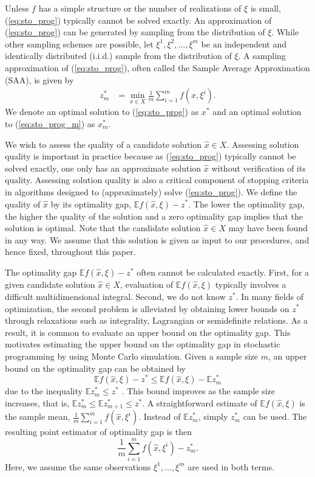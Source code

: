 \documentclass[12pt]{article}
\newcommand{\e}[1]{\mathbb{E} %
#1 %
}
\newcommand{\x}{x}
\newcommand{\xh}{{\hat{\x}}}
\newcommand{\xs}{\x^*}
\newcommand{\xit}{\xi}
\newcommand{\xiti}{\xit^i}
\newcommand{\zs}{z^*}
\begin{document}
Unless $f$ has a simple structure or the number of realizations of $\xi$ is small, (\ref{eq:sto_prog}) typically cannot be solved exactly. 
An approximation of (\ref{eq:sto_prog}) can be generated by sampling from the distribution of $\xi$.
While other sampling schemes are possible, let $\xit^1, \xit^2, \dots, \xit^m$ be an independent and identically distributed (i.i.d.) sample from the distribution of $\xit$.
A sampling approximation of (\ref{eq:sto_prog}), often called the Sample Average Approximation (SAA), is given by
\begin{align} \tag{SP$_m$} \label{eq:sto_prog_m}
	z_m^* & = \min_{\x \in X} \frac{1}{m} \sum_{i=1}^m f(\x,\xiti).
\end{align}
We denote an optimal solution to (\ref{eq:sto_prog}) as $\xs$ and an optimal solution to (\ref{eq:sto_prog_m}) as $\xs_m$.



We wish to assess the quality of a candidate solution $\xh \in X$. 
Assessing solution quality is important in practice because as (\ref{eq:sto_prog}) typically cannot be solved exactly, one only has an approximate solution $\xh$ without verification of its quality.
Assessing solution quality is also a critical component of stopping criteria in algorithms designed to (approximately) solve (\ref{eq:sto_prog}).
We define the quality of $\xh$ by its optimality gap, $\e{f(\xh,\xit)} - \zs$. 
The lower the optimality gap, the higher the quality of the solution and a zero optimality gap implies that the solution is optimal. 
Note that the candidate solution $\xh \in X$ may have been found in any way. 
We assume that this solution is given as input to our procedures, and hence fixed, throughout this paper. 


The optimality gap $\e{f(\xh,\xit)} - \zs$ often cannot be calculated exactly. First, for a given candidate solution $\xh \in X$, evaluation of $\e{f(\xh,\xit)}$ typically involves a difficult multidimensional integral. 
Second, we do not know $\zs$. 
In many fields of optimization, the second problem is alleviated by obtaining lower bounds on $\zs$ through relaxations such as integrality, Lagrangian or semidefinite relations.
As a result, it is common to evaluate an upper bound on the optimality gap. 
This motivates estimating the upper bound on the optimality gap in stochastic programming by using Monte Carlo simulation.
Given a sample size $m$, an upper bound on the optimality gap can be obtained by $$
\e{f(\xh,\xit)} - \zs \leq \e{f(\xh,\xit)} - \e{\zs_m}
$$ 
due to the inequality $\e{\zs_m} \leq \zs$ \citep{Mak1999,norkin_pflug_ruszczynski_98}.
This bound improves as the sample size increases, that is, $\e{\zs_m} \leq \e{\zs_{m+1}} \leq \zs$.  
A straightforward estimate of $\e{f(\xh,\xit)}$ is the sample mean, $\frac{1}{m} \sum_{i=1}^m f(\xh,\xiti)$. 
Instead of $\e{\zs_m}$, simply $\zs_m$ can be used.  
The resulting point estimator of optimality gap is then 
$$
\frac{1}{m} \sum_{i=1}^m f(\xh,\xiti) - \zs_m.
$$ 
Here, we assume the same observations $\xit^1, \dots, \xit^m$ are used in both terms.  
\end{document}

